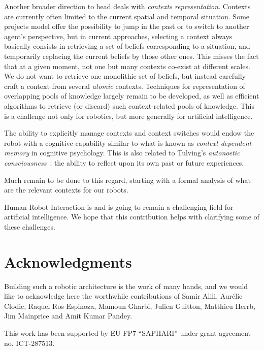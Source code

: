 \documentclass[preprint,3p,times]{elsarticle}
\begin{document}
Another broader direction to head deals with \emph{contexts representation}.
Contexts are currently often limited to the current spatial and temporal
situation. Some projects model offer the possibility to jump in the past or to
switch to another agent's perspective, but in current approaches, selecting a
context always basically consists in retrieving a set of beliefs corresponding
to a situation, and temporarily replacing the current beliefs by those other
ones. This misses the fact that at a given moment, not one but many contexts
co-exist at different scales. We do not want to retrieve one monolithic set of
beliefs, but instead carefully craft a context from several \emph{atomic}
contexts. Techniques for representation of overlapping pools of knowledge
largely remain to be developed, as well as efficient algorithms to retrieve (or
discard) such context-related pools of knowledge. This is a challenge not only for robotics, but more generally for artificial intelligence.

The ability to explicitly manage contexts and context switches would endow the
robot with a cognitive capability similar to what is known as
\emph{context-dependent memory} in cognitive psychology. This is also related
to Tulving's \emph{autonoetic consciousness}~\cite{Tulving1985a}: the ability
to reflect upon its own past or future experiences.

Much remain to be done to this regard, starting with a formal analysis of what
are the relevant contexts for our robots.

Human-Robot Interaction is and is going to remain a challenging field for
artificial intelligence. We hope that this contribution helps with clarifying
some of these challenges.

\section*{Acknowledgments}

Building such a robotic architecture is the work of many hands, and we would
like to acknowledge here the worthwhile contributions of Samir Alili, Aurélie
Clodic, Raquel Ros Espinoza, Mamoun Gharbi, Julien Guitton, Matthieu Herrb, Jim
Mainprice and Amit Kumar Pandey.

This work has been supported by EU FP7 ``SAPHARI'' under grant agreement no.
ICT-287513.



%

\end{document}

